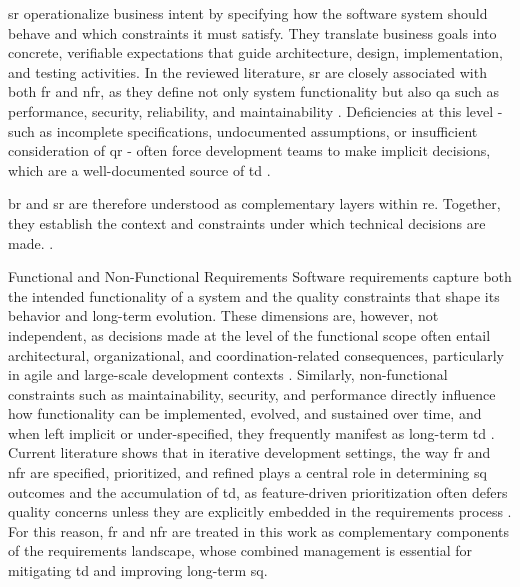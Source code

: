 \documentclass[12pt,reqno, twoside]{amsbook}
\makeatletter
\def\subsection{\@startsection{subsection}{2}%
      \z@{.5\linespacing\@plus.7\linespacing}{.25\linespacing}%
      {\normalfont\bfseries\flushleft}}
\theoremstyle{plain}
\numberwithin{equation}{chapter}
\numberwithin{section}{chapter}
\makeatother
\begin{document}
\gls{sr} operationalize business intent by specifying how the software system should behave and which constraints it must 
satisfy. They translate business goals into concrete, verifiable expectations that guide architecture, design, 
implementation, and testing activities. In the reviewed literature, \gls{sr} are closely associated with both \gls{fr} and 
\gls{nfr}, as they define not only system functionality but also \gls{qa} such as performance, security, 
reliability, and maintainability \parencite{Behutiye2019,Alenazi2025c}. Deficiencies at this level - such as incomplete 
specifications, undocumented assumptions, or insufficient consideration of \gls{qr} - often force development teams to make 
implicit decisions, which are a well-documented source of \gls{td} \parencite{Melo2022,Scott2025}.

\gls{br} and \gls{sr} are therefore understood as complementary layers within \gls{re}. Together, they establish the context 
and constraints under which technical decisions are made. \parencite{Femmer2019,Behutiye2022}.

\subsection{Functional and Non-Functional Requirements}
\noindent Software requirements capture both the intended functionality of a system and the quality constraints that 
shape its behavior and long-term evolution. These dimensions are, however, not independent, as decisions made at the 
level of the functional scope often entail architectural, organizational, and coordination-related consequences, 
particularly in agile and large-scale development contexts \parencite{Herath2025b,Herath2025}. Similarly, 
non-functional constraints such as maintainability, security, and performance directly influence how functionality can 
be implemented, evolved, and sustained over time, and when left implicit or under-specified, they frequently manifest 
as long-term \gls{td} \parencite{Borg2025}. Current literature shows that in iterative development settings, the way 
\gls{fr} and \gls{nfr} are specified, prioritized, and refined plays a central role in determining \gls{sq} outcomes and 
the accumulation of \gls{td}, as feature-driven prioritization often defers quality concerns unless they are explicitly 
embedded in the requirements process \parencite{Herath2025b,Borg2025}. For this reason, \gls{fr} and 
\gls{nfr} are treated in this work as complementary components of the requirements landscape, whose combined management 
is essential for mitigating \gls{td} and improving long-term \gls{sq}.
\end{document}
